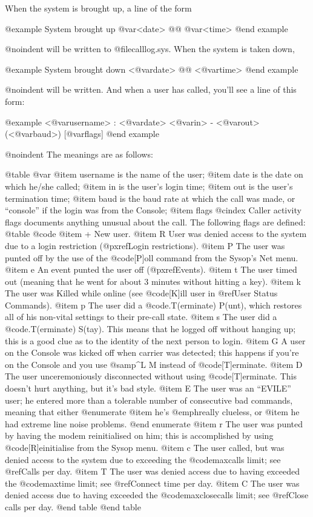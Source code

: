 When the system is brought up, a line of the form

@example
System brought up @var{<date>} @@ @var{<time>}
@end example

@noindent
will be written to @file{calllog.sys}.  When the system is taken down,

@example
System brought down <@var{date}> @@ <@var{time}>
@end example

@noindent
will be written.  And when a user has called, you'll see a line
of this form:

@example
<@var{username}>          :  <@var{date}> <@var{in}> - <@var{out}> (<@var{baud}>) [@var{flags}]    
@end example

@noindent
The meanings are as follows:

@table @var
@item username
is the name of the user;
@item date
is the date on which he/she called;
@item in
is the user's login time;
@item out
is the user's termination time;
@item baud
is the baud rate at which the call was made, or
``console'' if the login was from the Console;
@item flags
@cindex Caller activity flags
documents anything unusual about the call.  The
following flags are defined:
@table @code
@item +
New user.
@item R
User was denied access to the system due
to a login restriction (@pxref{Login restrictions}).
@item P
The user was punted off by the use of the
@code{[P]oll} command from the Sysop's Net menu.
@item e
An event punted the user off (@pxref{Events}).
@item t
The user timed out (meaning that he went
for about 3 minutes without hitting a key).
@item k
The user was Killed while online (see @code{[K]ill user} in
@ref{User Status Commands}).
@item p
The user did a @code{.T(erminate) P(unt)}, which
restores all of his non-vital settings to
their pre-call state.
@item s
The user did a @code{.T(erminate) S(tay)}.  This
means that he logged off without hanging
up; this is a good clue as to the identity
of the next person to login.
@item G
A user on the Console was kicked off when
carrier was detected; this happens if
you're on the Console and you use @samp{^L M} instead
of @code{[T]erminate}.
@item D
The user unceremoniously disconnected
without using @code{[T]erminate}.  This doesn't
hurt anything, but it's bad style.
@item E
The user was an ``EVILE'' user; he entered
more than a tolerable number of consecutive
bad commands, meaning that either
@enumerate
@item
he's @emph{really} clueless, or
@item
he had extreme line noise problems.
@end enumerate
@item r
The user was punted by having the modem
reinitialised on him; this is accomplished
by using @code{[R]einitialise} from the Sysop menu.
@item c
The user called, but was denied access to
the system due to exceeding the @code{maxcalls}
limit; see @ref{Calls per day}.
@item T
The user was denied access due to having
exceeded the @code{maxtime} limit; see @ref{Connect time per day}.
@item C
The user was denied access due to having
exceeded the @code{maxclosecalls} limit; see @ref{Close calls per day}.
@end table
@end table

